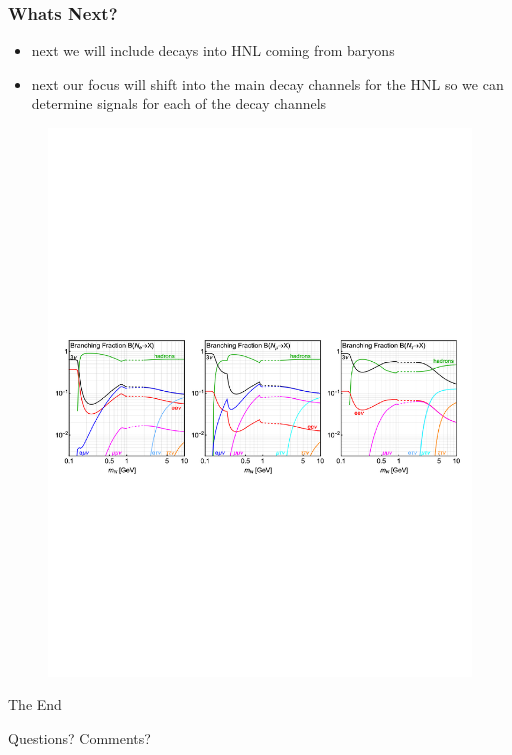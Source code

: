 \documentclass[
	11pt, %
]{beamer}
\begin{document}
\begin{frame}
\frametitle{Whats Next?}
\begin{itemize}
\item next we will include decays into HNL coming from baryons
\item next our focus will shift into the main decay channels for the HNL so we can determine signals for each of the decay channels
\end{itemize}
\begin{figure}
	\vspace*{-2cm}
	 \hspace*{-0cm}
	\includegraphics[scale=.4]{had_br_dom}
	\vspace*{-1cm}
	 \hspace*{-0cm}
	\caption{}
	\centering
\end{figure}
\end{frame}









\begin{frame}[plain] %
	\begin{center}
		{\Huge The End}
		
		\bigskip\bigskip %
		
		{\LARGE Questions? Comments?}
	\end{center}
\end{frame}



\end{document}
